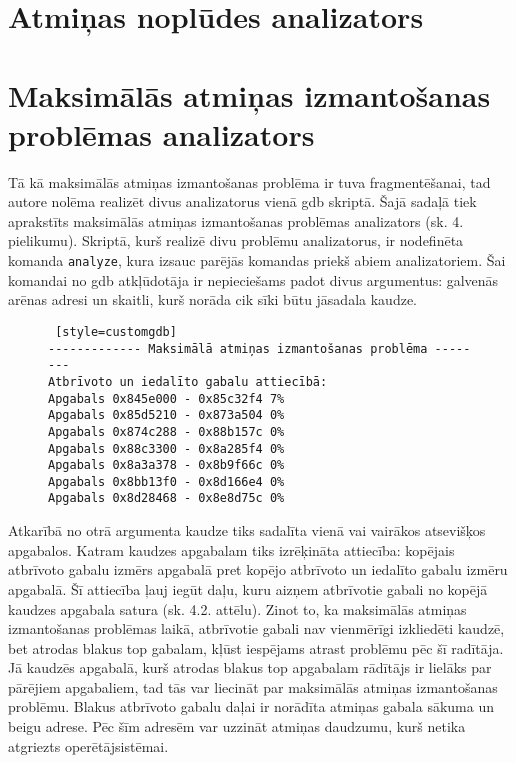 \section{Atmiņas noplūdes analizators}

\section{Maksimālās atmiņas izmantošanas problēmas analizators}
Tā kā maksimālās atmiņas izmantošanas problēma ir tuva fragmentēšanai, tad autore nolēma realizēt divus analizatorus vienā gdb skriptā.
Šajā sadaļā tiek aprakstīts maksimālās atmiņas izmantošanas problēmas analizators (sk. 4. pielikumu).
Skriptā, kurš realizē divu problēmu analizatorus, ir nodefinēta komanda \texttt{analyze}, kura izsauc parējās komandas priekš abiem analizatoriem.
Šai komandai no gdb atkļūdotāja ir nepieciešams padot divus argumentus: galvenās arēnas adresi un skaitli, kurš norāda cik sīki būtu jāsadala kaudze.

\begin{figure}[h]
\begin{lstlisting} [style=customgdb]
------------- Maksimālā atmiņas izmantošanas problēma --------
Atbrīvoto un iedalīto gabalu attiecībā:
Apgabals 0x845e000 - 0x85c32f4 7%
Apgabals 0x85d5210 - 0x873a504 0%
Apgabals 0x874c288 - 0x88b157c 0%
Apgabals 0x88c3300 - 0x8a285f4 0%
Apgabals 0x8a3a378 - 0x8b9f66c 0%
Apgabals 0x8bb13f0 - 0x8d166e4 0%
Apgabals 0x8d28468 - 0x8e8d75c 0%
\end{lstlisting}
\caption{\textbf{\fontsize{11}{12}\selectfont {Maksimālā atmiņas izmantošanas rādītājs}}}
\end{figure}


Atkarībā no otrā argumenta kaudze tiks sadalīta vienā vai vairākos atsevišķos apgabalos.
Katram kaudzes apgabalam tiks izrēķināta attiecība: kopējais atbrīvoto gabalu izmērs apgabalā pret kopējo atbrīvoto un iedalīto gabalu izmēru apgabalā.
Šī attiecība ļauj iegūt daļu, kuru aizņem atbrīvotie gabali no kopējā kaudzes apgabala satura (sk. 4.2. attēlu).
Zinot to, ka maksimālās atmiņas izmantošanas problēmas laikā, atbrīvotie gabali nav vienmērīgi izkliedēti kaudzē, bet atrodas blakus top gabalam, kļūst iespējams atrast problēmu pēc šī radītāja.
Jā kaudzēs apgabalā, kurš atrodas blakus top apgabalam rādītājs ir lielāks par pārējiem apgabaliem, tad tās var liecināt par maksimālās atmiņas izmantošanas problēmu.
Blakus atbrīvoto gabalu daļai ir norādīta atmiņas gabala sākuma un beigu adrese.
Pēc šīm adresēm var uzzināt atmiņas daudzumu, kurš netika atgriezts operētājsistēmai.

